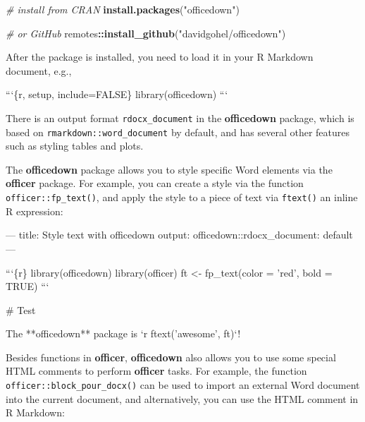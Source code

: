\documentclass[
  11pt,
]{krantz}
\newenvironment{Shaded}{\begin{snugshade}}{\end{snugshade}}
\newcommand{\BaseNTok}[1]{\textcolor[rgb]{0.06,0.06,0.06}{#1}}
\newcommand{\CommentTok}[1]{\textcolor[rgb]{0.37,0.37,0.37}{\textit{#1}}}
\newcommand{\FunctionTok}[1]{\textcolor[rgb]{0,0,0}{#1}}
\newcommand{\KeywordTok}[1]{\textcolor[rgb]{0.27,0.27,0.27}{\textbf{#1}}}
\newcommand{\NormalTok}[1]{#1}
\newcommand{\OperatorTok}[1]{\textcolor[rgb]{0.43,0.43,0.43}{\textbf{#1}}}
\newcommand{\StringTok}[1]{\textcolor[rgb]{0.5,0.5,0.5}{#1}}
\begin{document}
\begin{Shaded}
\begin{Highlighting}[]
\CommentTok{# install from CRAN}
\KeywordTok{install.packages}\NormalTok{(}\StringTok{"officedown"}\NormalTok{)}

\CommentTok{# or GitHub}
\NormalTok{remotes}\OperatorTok{::}\KeywordTok{install_github}\NormalTok{(}\StringTok{"davidgohel/officedown"}\NormalTok{)}
\end{Highlighting}
\end{Shaded}

After the package is installed, you need to load it in your R Markdown document, e.g.,

\begin{Shaded}
\begin{Highlighting}[]
\BaseNTok{```\{r, setup, include=FALSE\}}
\BaseNTok{library(officedown)}
\BaseNTok{```}
\end{Highlighting}
\end{Shaded}

There is an output format \texttt{rdocx\_document} in the \textbf{officedown} package, which is based on \texttt{rmarkdown::word\_document} by default, and has several other features such as styling tables and plots.

The \textbf{officedown} package allows you to style specific Word elements via the \textbf{officer} package. For example, you can create a style via the function \texttt{officer::fp\_text()}, and apply the style to a piece of text via \texttt{ftext()} an inline R expression:

\begin{Shaded}
\begin{Highlighting}[]
\NormalTok{---}
\NormalTok{title: Style text with officedown}
\NormalTok{output:}
\NormalTok{  officedown::rdocx_document: default}
\NormalTok{---}

\BaseNTok{```\{r\}}
\BaseNTok{library(officedown)}
\BaseNTok{library(officer)}
\BaseNTok{ft <- fp_text(color = 'red', bold = TRUE)}
\BaseNTok{```}

\FunctionTok{# Test}

\NormalTok{The **officedown** package is}
\BaseNTok{`r ftext('awesome', ft)`}\NormalTok{!}
\end{Highlighting}
\end{Shaded}

Besides functions in \textbf{officer}, \textbf{officedown} also allows you to use some special HTML comments to perform \textbf{officer} tasks. For example, the function \texttt{officer::block\_pour\_docx()} can be used to import an external Word document into the current document, and alternatively, you can use the HTML comment in R Markdown:
\end{document}
